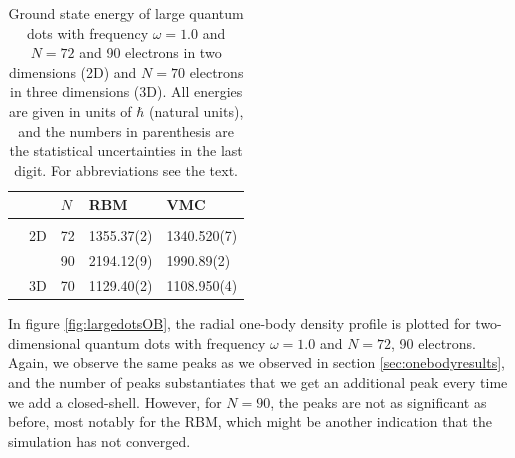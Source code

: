 \begin{table}
	\caption{Ground state energy of large quantum dots with frequency $\omega=1.0$ and $N=72$ and 90 electrons in two dimensions (2D) and $N=70$ electrons in three dimensions (3D). All energies are given in units of $\hbar$ (natural units), and the numbers in parenthesis are the statistical uncertainties in the last digit. For abbreviations see the text.}
	\label{tab:largeQD}
	\begin{tabularx}{\textwidth}{R{1.6cm}R{2cm}R{2cm}R{3cm}R{3cm}} \hline\hline
		& \makecell{\\ \phantom{$N$}} & $N$ & RBM & VMC \\ \hline \\
		& 2D & 72 & 1355.37(2) & 1340.520(7) \\
		&& 90 & 2194.12(9) & 1990.89(2) \\
		& 3D & 70 & 1129.40(2) & 1108.950(4) \\
		\hline \hline
	\end{tabularx}
\end{table}

In figure \eqref{fig:largedotsOB}, the radial one-body density profile is plotted for two-dimensional quantum dots with frequency $\omega=1.0$ and $N=72$, 90 electrons. Again, we observe the same peaks as we observed in section \ref{sec:onebodyresults}, and the number of peaks substantiates that we get an additional peak every time we add a closed-shell. However, for $N=90$, the peaks are not as significant as before, most notably for the RBM, which might be another indication that the simulation has not converged.

